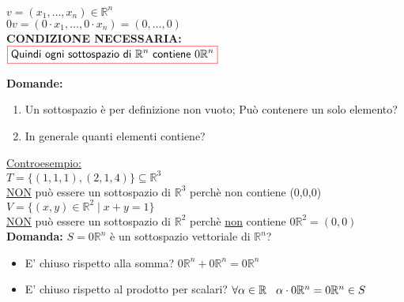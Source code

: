 \noindent\begin{minipage}{.5\linewidth}

\end{minipage}
\begin{minipage}{.45\linewidth}
$v = (x_1, \dots, x_n) \in \mathbb{R}^n$ \\
$0v = (0 \cdot x_1, \dots, 0 \cdot x_n) = (0, \dots , 0)$ \\
\textbf{\small CONDIZIONE NECESSARIA:} \\
$\color{red}\boxed{\normalcolor\textsf{Quindi ogni sottospazio di } \mathbb{R}^n \textsf{ contiene } 0\mathbb{R}^n}$
\end{minipage}

\flushleft\textbf{Domande:} \\
\begin{enumerate}
	\item \textsf{\small Un sottospazio è per definizione non vuoto; Può contenere un solo elemento?}
	\item \textsf{\small In generale quanti elementi contiene?}
\end{enumerate}

\textsf{\small \underline{Controesempio: }} \\
\(
T = \{ (1,1,1) , (2,1,4)\} \subseteq \mathbb{R}^3
\)\\
\textsf{\small \underline{NON} può essere un sottospazio di $\mathbb{R}^3$ perchè non contiene (0,0,0)} \\
\(
V = \{ (x,y) \in \mathbb{R}^2 \mid x + y = 1\}
\)\\
\textsf{\small \underline{NON} può essere un sottospazio di $\mathbb{R}^2$ perchè \underline{non} contiene $0\mathbb{R}^2 = (0,0)$ } \\
\vspace{0.2cm}
\textbf{Domanda:}
$S = {0\mathbb{R}^n}$ \textsf{\small è un sottospazio vettoriale di $\mathbb{R}^n$?}\\
\begin{itemize}
	\item \textsf{\small E' chiuso rispetto alla somma?} $0\mathbb{R}^n + 0\mathbb{R}^n = 0\mathbb{R}^n$
	\item \textsf{\small E' chiuso rispetto al prodotto per scalari?} $\forall \alpha \in \mathbb{R} \hspace{0.3cm} \alpha \cdot 0\mathbb{R}^n = 0\mathbb{R}^n \in S$
\end{itemize}

